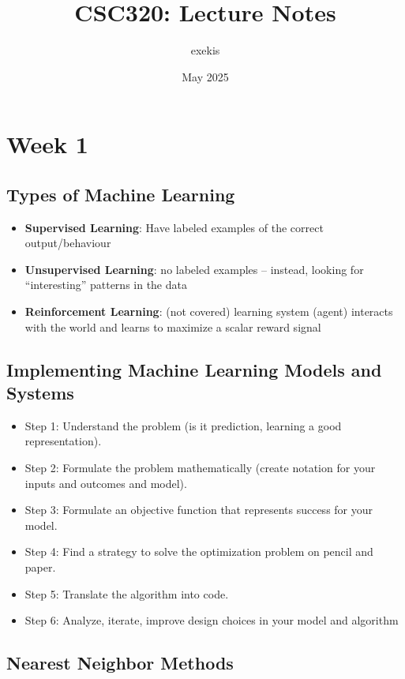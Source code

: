 \documentclass{article}
\title{CSC320: Lecture Notes}
\author{exekis}
\date{May 2025}
\begin{document}
\maketitle

\section*{Week 1}

\subsection*{Types of Machine Learning}
\begin{itemize}
    \item \textbf{Supervised Learning}: Have labeled examples of the correct output/behaviour
    \item \textbf{Unsupervised Learning}: no labeled examples – instead, looking
    for “interesting” patterns in the data
    \item \textbf{Reinforcement Learning}: (not covered) learning system (agent)
      interacts with the world and learns to maximize a scalar reward
      signal
\end{itemize}

\subsection*{Implementing Machine Learning Models and Systems}
\begin{itemize}
    \item Step 1: Understand the problem (is it prediction, learning a good representation).
    \item Step 2: Formulate the problem mathematically (create notation for your inputs and outcomes and model).
    \item Step 3: Formulate an objective function that represents success for your model.
    \item Step 4: Find a strategy to solve the optimization problem on pencil and paper.
    \item Step 5: Translate the algorithm into code.
    \item Step 6: Analyze, iterate, improve design choices in your model and algorithm
\end{itemize}

\subsection*{Nearest Neighbor Methods}
\end{document}
